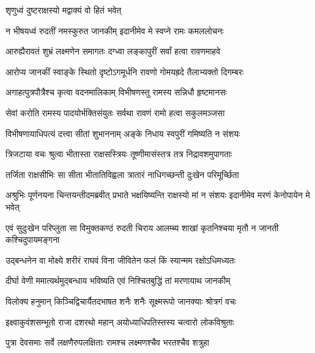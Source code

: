 \onelineshloka
{शृणुध्वं दुष्टराक्षस्यो मद्वाक्यं वो हितं भवेत्} %

\twolineshloka
{न भीषयध्वं रुदतीं नमस्कुरुत जानकीम्}
{इदानीमेव मे स्वप्ने रामः कमललोचनः} %

\twolineshloka
{आरुह्यैरावतं शुभ्रं लक्ष्मणेन समागतः}
{दग्ध्वा लङ्कापुरीं सर्वां हत्वा रावणमाहवे} %

\twolineshloka
{आरोप्य जानकीं स्वाङ्के स्थितो दृष्टोऽगमूर्धनि}
{रावणो गोमयह्रदे तैलाभ्यक्तो दिगम्बरः} %

\twolineshloka
{अगाहत्पुत्रपौत्रैश्च कृत्वा वदनमालिकाम्}
{विभीषणस्तु रामस्य सन्निधौ हृष्टमानसः} %

\twolineshloka
{सेवां करोति रामस्य पादयोर्भक्तिसंयुतः}
{सर्वथा रावणं रामो हत्वा सकुलमञ्जसा} %

\twolineshloka
{विभीषणायाधिपत्यं दत्त्वा सीतां शुभाननाम्}
{अङ्के निधाय स्वपुरीं गमिष्यति न संशयः} %

\twolineshloka
{त्रिजटाया वचः श्रुत्वा भीतास्ता राक्षसस्त्रियः}
{तूष्णीमासंस्तत्र तत्र निद्रावशमुपागताः} %

\twolineshloka
{तर्जिता राक्षसीभिः सा सीता भीतातिविह्वला}
{त्रातारं नाधिगच्छन्ती दुःखेन परिमूर्च्छिता} %

\threelineshloka
{अश्रुभिः पूर्णनयना चिन्तयन्तीदमब्रवीत्}
{प्रभाते भक्षयिष्यन्ति राक्षस्यो मां न संशयः}
{इदानीमेव मरणं केनोपायेन मे भवेत्} %

\fourlineindentedshloka
{एवं सुदुःखेन परिप्लुता सा}
{विमुक्तकण्ठं रुदती चिराय}
{आलम्ब्य शाखां कृतनिश्चया मृतौ}
{न जानती कश्चिदुपायमङ्गना} %






\twolineshloka
{उद्बन्धनेन वा मोक्ष्ये शरीरं राघवं विना}
{जीवितेन फलं किं स्यान्मम रक्षोऽधिमध्यतः} %

\twolineshloka
{दीर्घा वेणी ममात्यर्थमुद्बन्धाय भविष्यति}
{एवं निश्चितबुद्धिं तां मरणायाथ जानकीम्} %

\twolineshloka
{विलोक्य हनुमान् किञ्चिद्विचार्यैतदभाषत}
{शनैः शनैः सूक्ष्मरूपो जानक्याः श्रोत्रगं वचः} %

\twolineshloka
{इक्ष्वाकुवंशसम्भूतो राजा दशरथो महान्}
{अयोध्याधिपतिस्तस्य चत्वारो लोकविश्रुताः} %

\twolineshloka
{पुत्रा देवसमाः सर्वे लक्षणैरुपलक्षिताः}
{रामश्च लक्ष्मणश्चैव भरतश्चैव शत्रुहा} %


